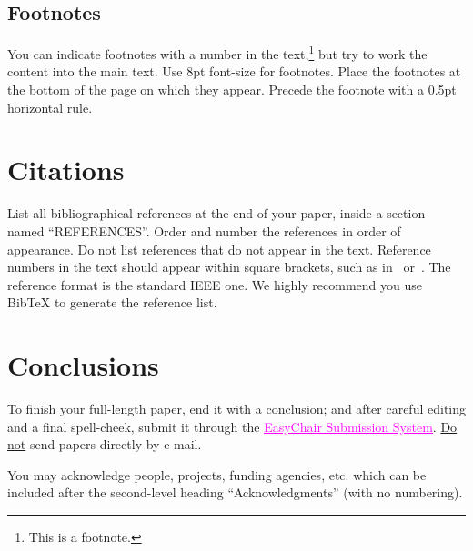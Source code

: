 \documentclass{article}
\begin{document}

\subsection{Footnotes}
You can indicate footnotes with a number in the text,\footnote{This is a footnote.}
but try to work the content into the main text.
Use 8pt font-size for footnotes. 
Place the footnotes at the bottom of the page 
on which they appear. 
Precede the footnote with a 0.5pt horizontal rule.

\section{Citations}
List all bibliographical references at the end of your paper,
inside a section named ``REFERENCES''.
Order and number the references in order of appearance. 
Do not list references that do not appear in the text.
Reference numbers in the text should appear within square brackets, such as 
in~\cite{Someone:13} or~\cite{Someone:13,Someone:04,Someone:09}.
The reference format is the standard IEEE one. 
We highly recommend you use BibTeX 
to generate the reference list.

\section{Conclusions}
To finish your full-length paper, end it with a conclusion;
and after careful editing and a final spell-cheek,
submit it through the \href{https://easychair.org/conferences/?conf=tenor2017}{\textcolor {magenta} {\underline {EasyChair Submission System}}}. 
\underline{Do not} send papers directly by e-mail.
%
\begin{acknowledgments}
You may acknowledge people, projects, 
funding agencies, etc. 
which can be included after the second-level heading
``Acknowledgments'' (with no numbering).
\end{acknowledgments} 

\balance

\end{document}
